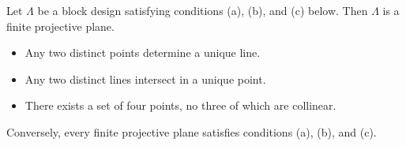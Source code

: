 Let $\Lambda$ be a block design satisfying conditions (a), (b), and (c) below. Then $\Lambda$ is a finite projective plane.

\begin{itemize}
\item[(a)] Any two distinct points determine a unique line.
\item[(b)] Any two distinct lines intersect in a unique point.
\item[(c)] There exists a set of four points, no three of which are collinear.
\end{itemize}

Conversely, every finite projective plane satisfies conditions (a), (b), and (c).
